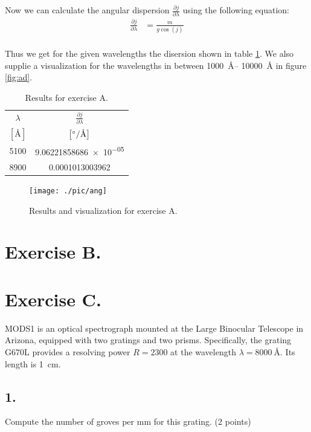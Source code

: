 \documentclass[11pt,a4paper,twoside]{article}
\begin{document}
Now we can calculate the angular dispersion $\frac{\partial j}{\partial\lambda}$ 
using the following equation:
\begin{align}
    \frac{\partial j}{\partial \lambda} &= \frac{m}{g\cos(j)}    \\
\end{align}

Thus we get for the given wavelengths the disersion shown in table \ref{tab:ad}.
We also supplie a visualization for the wavelengths in between \SIrange{1000}{
10000}{\angstrom} in figure \ref{fig:ad}.
\begin{table}[h!]
\centering
\begin{tabular}{cc}\toprule
    $\lambda$   & $\frac{\partial j}{\partial \lambda}$  \\
    $\left[\si{\angstrom}\right]$ 
                & $\left[\si[per-mode=symbol]{\degree\per\angstrom}\right]$ \\
    \midrule
    5100        &   \num[round-mode=places, round-precision=4]{9.06221858686e-05} \\
    8900        &   \num[round-mode=places, round-precision=4]{0.0001013003962}   \\
\bottomrule
\end{tabular}
\caption{Results for exercise A.}
\label{tab:ad}
\end{table}

\begin{figure}
\centering
\texttt{[image: ./pic/ang]}
\caption{Results and visualization for exercise A.}
\end{figure}

\section*{Exercise B.}
\section*{Exercise C.}

MODS1 is an optical spectrograph mounted at the Large Binocular Telescope in 
Arizona, equipped with two gratings and two prisms. Specifically, the grating 
G670L provides a resolving power $R = \num{2300}$ at the wavelength 
$\lambda = \SI{8000}{\angstrom}$. Its length is \SI{1}{\cm}.

\subsection*{1.} Compute the number of groves per mm for this grating. (2 points) \\
\end{document}
